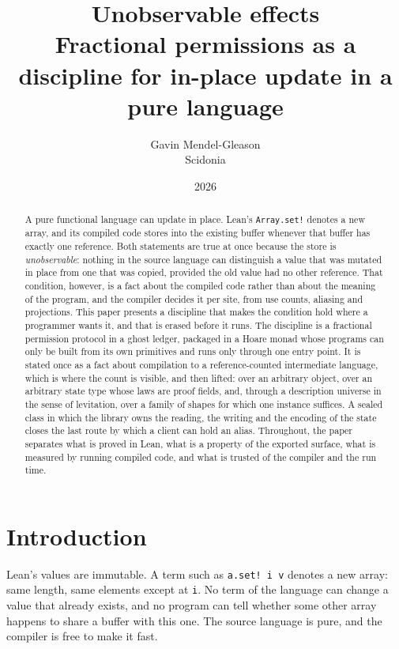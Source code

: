 \documentclass[11pt,a4paper]{article}
\title{Unobservable effects\\[2pt]
\large Fractional permissions as a discipline for in-place update in a pure language}
\author{Gavin Mendel-Gleason\\\small Scidonia}
\date{2026}
\theoremstyle{definition}
\theoremstyle{plain}
\newcommand{\code}[1]{\texttt{#1}}
\begin{document}
\maketitle

\begin{abstract}
A pure functional language can update in place. Lean's \code{Array.set!} denotes a
new array, and its compiled code stores into the existing buffer whenever that
buffer has exactly one reference. Both statements are true at once because the
store is \emph{unobservable}: nothing in the source language can distinguish a
value that was mutated in place from one that was copied, provided the old
value had no other reference. That condition, however, is a fact about the
compiled code rather than about the meaning of the program, and the compiler
decides it per site, from use counts, aliasing and projections. This paper
presents a discipline that makes the condition hold where a programmer wants it,
and that is erased before it runs. The discipline is a fractional permission
protocol in a ghost ledger, packaged in a Hoare monad whose programs can only be
built from its own primitives and runs only through one entry point. It is
stated once as a fact about compilation to a reference-counted intermediate
language, which is where the count is visible, and then lifted: over an
arbitrary object, over an arbitrary state type whose laws are proof fields, and,
through a description universe in the sense of levitation, over a family of
shapes for which one instance suffices. A sealed class in which the library owns
the reading, the writing and the encoding of the state closes the last route by
which a client can hold an alias. Throughout, the paper separates what is proved
in Lean, what is a property of the exported surface, what is measured by running
compiled code, and what is trusted of the compiler and the run time.
\end{abstract}

\section{Introduction}

Lean's values are immutable. A term such as \code{a.set! i v} denotes a new
array: same length, same elements except at \code{i}. No term of the language can
change a value that already exists, and no program can tell whether some other
array happens to share a buffer with this one. The source language is pure, and
the compiler is free to make it fast.
\end{document}
